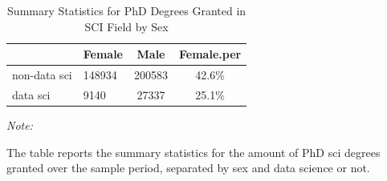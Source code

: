 \documentclass[
  12pt,
]{article}
\begin{document}
\begin{table}[H]

\caption{\label{tab:unnamed-chunk-13}Summary Statistics for PhD Degrees Granted in SCI Field by Sex}
\centering
\begin{threeparttable}
\begin{tabular}[t]{llcc}
\toprule
  & Female & Male & Female.per\\
\midrule
non-data sci & 148934 & 200583 & 42.6\%\\
data sci & 9140 & 27337 & 25.1\%\\
\bottomrule
\end{tabular}
\begin{tablenotes}
\item \textit{Note: } 
\item The table reports the summary statistics for the amount of PhD sci degrees granted over the sample period, separated by sex and data science or not.
\end{tablenotes}
\end{threeparttable}
\end{table}
\end{document}
